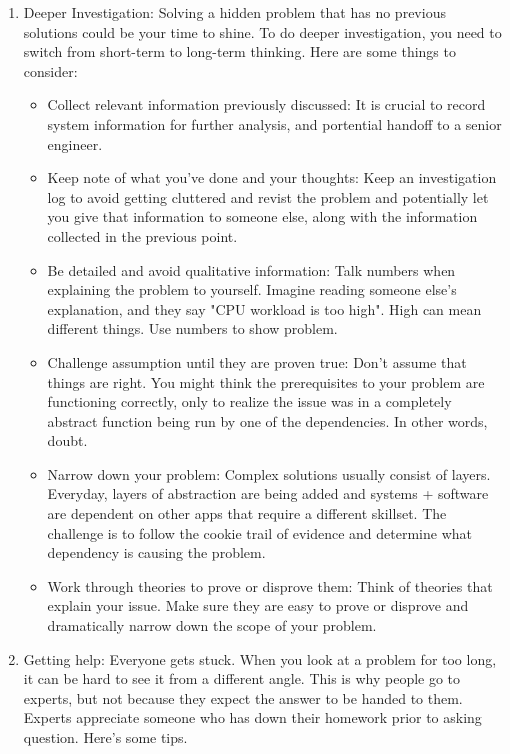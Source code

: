 \documentclass[11pt]{article}
\begin{document}
\begin{enumerate}
\begin{enumerate}
    \item Deeper Investigation: Solving a hidden problem that has no previous solutions could be your time to shine. To do deeper investigation, you need to switch from short-term to long-term thinking. Here are some things to consider:
        \begin{itemize}
            \item Collect relevant information previously discussed: It is crucial to record system information for further analysis, and portential handoff to a senior engineer.
            \item Keep note of what you've done and your thoughts: Keep an investigation log to avoid getting cluttered and revist the problem and potentially let you give that information to someone else, along with the information collected in the previous point. 
            \item Be detailed and avoid qualitative information: Talk numbers when explaining the problem to yourself. Imagine reading someone else's explanation, and they say "CPU workload is too high". High can mean different things. Use numbers to show problem.
            \item Challenge assumption until they are proven true: Don't assume that things are right. You might think the prerequisites to your problem are functioning correctly, only to realize the issue was in a completely abstract function being run by one of the dependencies. In other words, doubt. 
            \item Narrow down your problem: Complex solutions usually consist of layers. Everyday, layers of abstraction are being added and systems + software are dependent on other apps that require a different skillset. The challenge is to follow the cookie trail of evidence and determine what dependency is causing the problem.
            \item Work through theories to prove or disprove them: Think of theories that explain your issue. Make sure they are easy to prove or disprove and dramatically narrow down the scope of your problem.
        \end{itemize}
    \item Getting help: Everyone gets stuck. When you look at a problem for too long, it can be hard to see it from a different angle. This is why people go to experts, but not because they expect the answer to be handed to them. Experts appreciate someone who has down their homework prior to asking question. Here's some tips.
        \begin{itemize}

\end{itemize}
\end{enumerate}
\end{enumerate}
\end{document}
